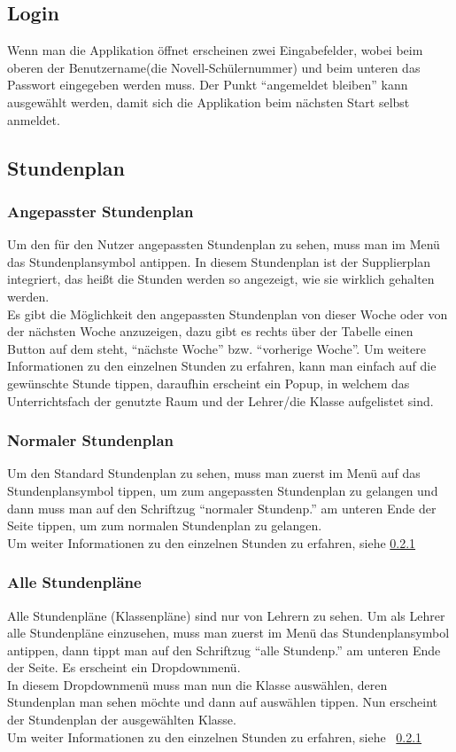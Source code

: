 \subsection{Login}
Wenn man die Applikation öffnet erscheinen zwei Eingabefelder, wobei beim oberen der Benutzername(die Novell-Schülernummer) und beim unteren das Passwort eingegeben werden muss. Der Punkt \enquote{angemeldet bleiben} kann ausgewählt werden, damit sich die Applikation beim nächsten Start selbst anmeldet. 

\subsection{Stundenplan}
\subsubsection{Angepasster Stundenplan}
\label{sec:angepasster_stundenplan}
Um den für den Nutzer angepassten Stundenplan zu sehen, muss man im Menü das Stundenplansymbol antippen. In diesem Stundenplan ist der Supplierplan integriert, das heißt die Stunden werden so angezeigt, wie sie wirklich gehalten werden.\\
Es gibt die Möglichkeit den angepassten Stundenplan von dieser Woche oder von der nächsten Woche anzuzeigen, dazu gibt es rechts über der Tabelle einen Button auf dem steht, \enquote{nächste Woche} bzw. \enquote{vorherige Woche}.
Um weitere Informationen zu den einzelnen Stunden zu erfahren, kann man einfach auf die gewünschte Stunde tippen, daraufhin erscheint ein Popup, in welchem das Unterrichtsfach der genutzte Raum und der Lehrer/die Klasse aufgelistet sind.

\subsubsection{Normaler Stundenplan}
Um den Standard Stundenplan zu sehen, muss man zuerst im Menü auf das Stundenplansymbol tippen, um zum angepassten Stundenplan zu gelangen und dann muss man auf den Schriftzug \enquote{normaler Stundenp.} am unteren Ende der Seite tippen, um zum normalen Stundenplan zu gelangen.\\
Um weiter Informationen zu den einzelnen Stunden zu erfahren, siehe \ref{sec:angepasster_stundenplan}

\subsubsection{Alle Stundenpläne}
Alle Stundenpläne (Klassenpläne) sind nur von Lehrern zu sehen. Um als Lehrer alle Stundenpläne einzusehen, muss man zuerst im Menü das Stundenplansymbol antippen, dann tippt man auf den Schriftzug \enquote{alle Stundenp.} am unteren Ende der Seite. Es erscheint ein Dropdownmenü.\\
In diesem Dropdownmenü muss man nun die Klasse auswählen, deren Stundenplan man sehen möchte und dann auf auswählen tippen. Nun erscheint der Stundenplan der ausgewählten Klasse.\\
Um weiter Informationen zu den einzelnen Stunden zu erfahren, siehe ~\ref{sec:angepasster_stundenplan}

